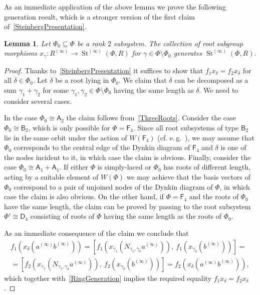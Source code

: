 \documentclass[oneside, 11pt]{amsart}
\numberwithin{equation}{section}
\newtheorem{lemma}{Lemma} \numberwithin{lemma}{section}
\theoremstyle{definition}
\theoremstyle{remark}
\DeclareMathOperator\St{St}
\newcommand{\rA}{\mathsf{A}}
\newcommand{\rB}{\mathsf{B}}
\newcommand{\rD}{\mathsf{D}}
\newcommand{\rF}{\mathsf{F}}
\begin{document}
As an immediate application of the above lemma we prove the following generation result, which is a stronger version of the first claim of~\cref{SteinbergPresentation}.
 \begin{lemma}\label{DoubleRootElimination}
  Let \(\Phi_0 \subseteq \Phi\) be a rank \(2\) subsystem.
  The collection of root subgroup morphisms $x_\gamma \colon R^{(\infty)} \to \St^{(\infty)}(\Phi, R)$ for $\gamma \in \Phi\setminus \Phi_0$ generates $\St^{(\infty)}(\Phi, R)$.
 \end{lemma}
 \begin{proof}
  Thanks to~\cref{SteinbergPresentation} it suffices to show that $f_1 x_\delta = f_2 x_\delta$ for all $\delta \in \Phi_0$.
  Let $\delta$ be a root lying in $\Phi_0$. We claim that $\delta$ can be decomposed as a sum $\gamma_1 + \gamma_2$ for some $\gamma_1,\gamma_2 \in \Phi\setminus\Phi_0$ having the same length as $\delta$.
  We need to consider several cases. 
  
  In the case \(\Phi_0 \cong \rA_2\) the claim follows from~\cref{ThreeRoots}.
  Consider the case $\Phi_0 \cong \rB_2$, which is only possible for $\Phi=\rF_4$.
  Since all root subsystems of type $\rB_2$ lie in the same orbit under the action of $W(\rF_4)$ (cf. e.\,g.~\cite[Table~8]{Ca72}), we may assume that $\Phi_0$ corresponds to the central edge of the Dynkin diagram of $\rF_4$ and $\delta$ is one of the nodes incident to it, in which case the claim is obvious. Finally, consider the case $\Phi_0 \cong \rA_1+\rA_1$. If either $\Phi$ is simply-laced or $\Phi_0$ has roots of different length, acting by a suitable element of $W(\Phi)$ we may achieve that the basis vectors of $\Phi_0$ correspond to a pair of unjoined nodes of the Dynkin diagram of $\Phi$, in which case the claim is also obvious. On the other hand, if $\Phi=\rF_4$ and the roots of $\Phi_0$ have the same length, the claim can be proved by passing to the root subsystem $\Phi'\cong \rD_4$ consisting of roots of $\Phi$ having the same length as the roots of $\Phi_0$.    
  
  As an immediate consequence of the claim we conclude that
  \begin{multline*} f_1(x_\delta(a^{(\infty)}b^{(\infty)})) = [f_1(x_{\gamma_1}(N_{\gamma_1, \gamma_2}a^{(\infty)})),\ f_1(x_{\gamma_2}(b^{(\infty)}))] = \\
  = [f_2(x_{\gamma_1}(N_{\gamma_1, \gamma_2}a^{(\infty)})),\ f_2(x_{\gamma_2}(b^{(\infty)}))] = f_2(x_\delta(a^{(\infty)}b^{(\infty)})), \end{multline*}
  which together with~\cref{RingGeneration} implies the required equality $f_1 x_\delta = f_2 x_\delta$.
 \end{proof}
\end{document}
